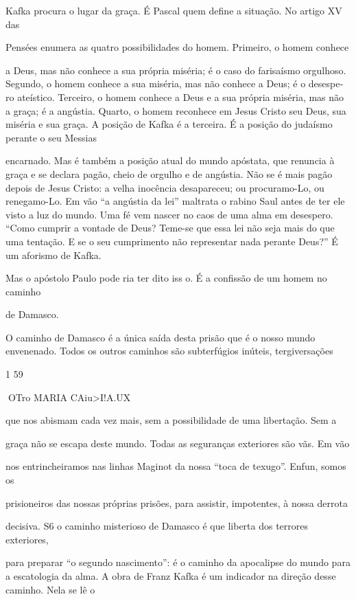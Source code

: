 Kafka procura o lugar da graça. É Pascal quem define a situação. No
artigo XV das

Pensées enumera as quatro possibilidades do homem. Primeiro, o homem
conhece

a Deus, mas não conhece a sua própria miséria; é o caso do farisaísmo
orgulhoso. Segundo, o homem conhece a sua miséria, mas não conhece a
Deus; é o desespe­ ro ateístico. Terceiro, o homem conhece a Deus e a
sua própria miséria, mas não a graça; é a angústia. Quarto, o homem
reconhece em Jesus Cristo seu Deus, sua miséria e sua graça. A posição
de Kafka é a terceira. É a posição do judaísmo perante o seu Messias

encarnado. Mas é também a posição atual do mundo apóstata, que renuncia
à graça e se declara pagão, cheio de orgulho e de angústia. Não se é
mais pagão depois de Jesus Cristo: a velha inocência desapareceu; ou
procuramo-Lo, ou renegamo-Lo. Em vão ``a angústia da lei'' maltrata o
rabino Saul antes de ter ele visto a luz do mundo. Uma fé vem nascer no
caos de uma alma em desespero. ``Como cumprir a vontade de Deus? Teme-se
que essa lei não seja mais do que uma tentação. E se o seu cumprimento
não representar nada perante Deus?'' É um aforismo de Kafka.

Mas o apóstolo Paulo pode ria ter dito iss o. É a confissão de um homem
no caminho

de Damasco.

O caminho de Damasco é a única saída desta prisão que é o nosso mundo
envenenado. Todos os outros caminhos são subterfúgios inúteis,
tergiversações

1 59

OTro MARIA CAiu\textgreater I!A.UX

que nos abismam cada vez mais, sem a possibilidade de uma libertação.
Sem a

graça não se escapa deste mundo. Todas as seguranças exteriores são vãs.
Em vão

nos entrincheiramos nas linhas Maginot da nossa ``toca de texugo''.
Enfun, somos os

prisioneiros das nossas próprias prisões, para assistir, impotentes, à
nossa derrota

decisiva. S6 o caminho misterioso de Damasco é que liberta dos terrores
exteriores,

para preparar ``o segundo nascimento'': é o caminho da apocalipse do
mundo para a escatologia da alma. A obra de Franz Kafka é um indicador
na direção desse caminho. Nela se lê o

